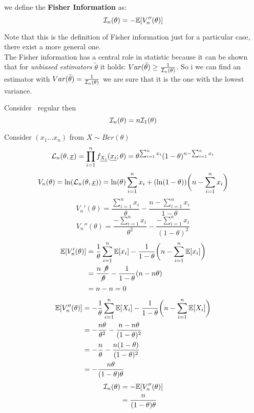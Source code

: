 \begin{defi}
	we define the \textbf{Fisher Information} as:
	$$\mathcal{I}_n(\theta)=-\mathbb{E}[V_n''(\theta)]$$
\end{defi}
Note that this is the definition of Fisher information just for a particular case, there exist a more general one.\\
The Fisher information has a central role in statistic because it can be shown that for \textit{unbiased estimators} $\tilde \theta$ it holds: $Var(\tilde \theta)\geq \frac{1}{\mathcal{I}_n(\theta)}$. So i we can find an estimator with  $Var(\tilde \theta)= \frac{1}{\mathcal{I}_n(\theta)}$ we are sure that it is the one with the lowest variance.\\
\begin{prop}
	Consider \rsf \  regular then
	$$\mathcal{I}_n(\theta)=n\mathcal{I}_1(\theta)$$
\end{prop}
\begin{eg}
	Consider $(x_1...x_n)$ from $X\sim Ber(\theta)$
	$$\mathcal{L}_n(\theta,\underline x) = \prod_{i=1}^{n} f_{\underline{X_i}}(\underline{x_i};\theta)=\theta^{\sum_{i=1}^{n}x_i}(1-\theta)^{n-\sum_{i=1}^{n}x_i}$$
	$$V_n(\theta)=\ln(\mathcal{L}_n(\theta,\underline x))=\ln(\theta)\sum_{i=1}^{n}x_i+(\ln(1-\theta))\bigg(n-\sum_{i=1}^{n}x_i\bigg)$$
	$$V_n'(\theta)=\frac{\sum_{i=1}^{n}x_i}{\theta}-\frac{n- \sum_{i=1}^{n}x_i}{1-\theta}$$
	$$V_n''(\theta)=\frac{-\sum_{i=1}^{n}x_i}{\theta^2}-\frac{-\sum_{i=1}^{n}x_i}{(1-\theta)^2}$$
	\[
	\begin{split}
	\mathbb{E}[V_n'(\theta)]
	&	=\frac{1}{\theta}\sum_{i=1}^{n}\mathbb{E}[x_i]-\frac{1}{1-\theta}\bigg( n- \sum_{i=1}^{n}\mathbb{E}[x_i]\bigg)\\
	&=\frac{n\not \theta}{\not \theta}-\frac{1}{1-\theta}(n-n\theta)\\
	&=n-n=0
	\end{split}
	\]
	\[
	\begin{split}
		\mathbb{E}[V_n''(\theta)]
		&=-\frac{1}{\theta}\sum_{i=1}^{n}\mathbb{E}[X_i]-\frac{1}{1-\theta}\bigg( n- \sum_{i=1}^{n}\mathbb{E}[X_i] \bigg)\\
		&=-\frac{n\theta}{\theta^2}-\frac{n-n\theta}{(1-\theta)^2}\\
		&=-\frac{n}{\theta}-\frac{n(1-\theta)}{(1-\theta)^2}\\
		&=-\frac{n\theta}{(1-\theta)\theta}
	\end{split}
	\]
	\[
	\begin{split}
	\mathcal{I}_n(\theta)
	&=-\mathbb{E}[V_n''(\theta)]\\
	&=\frac{n}{(1-\theta)\theta}
	\end{split}
	\]
\end{eg}

